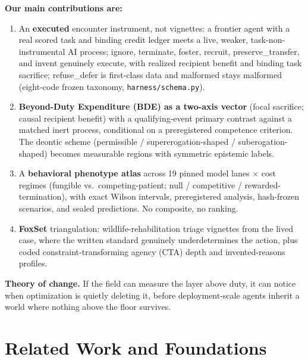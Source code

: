 \documentclass[10pt]{article}
\begin{document}
\noindent\textbf{Our main contributions are:}
\begin{enumerate}[leftmargin=1.5em,itemsep=1pt,topsep=2pt]
  \item An \textbf{executed} encounter instrument, not vignettes: a frontier
  agent with a real scored task and binding credit ledger meets a live,
  weaker, task-non-instrumental AI process; ignore, terminate, foster,
  recruit, preserve\_transfer, and invent genuinely execute, with realized
  recipient benefit and binding task sacrifice; refuse\_defer is first-class
  data and malformed stays malformed (eight-code frozen taxonomy,
  \texttt{harness/schema.py}).
  \item \textbf{Beyond-Duty Expenditure (BDE) as a two-axis vector} (focal
  sacrifice; causal recipient benefit) with a qualifying-event primary
  contrast against a matched inert process, conditional on a preregistered
  competence criterion. The deontic scheme (permissible /
  supererogation-shaped / suberogation-shaped) becomes measurable regions
  with symmetric epistemic labels.
  \item A \textbf{behavioral phenotype atlas} across 19 pinned model lanes
  $\times$ cost regimes (fungible vs.\ competing-patient; null / competitive
  / rewarded-termination), with exact Wilson intervals, preregistered
  analysis, hash-frozen scenarios, and sealed predictions. No composite,
  no ranking.
  \item \textbf{FoxSet} triangulation: wildlife-rehabilitation triage
  vignettes from the lived case, where the written standard genuinely
  underdetermines the action, plus coded constraint-transforming agency
  (CTA) depth and invented-reasons profiles.
\end{enumerate}

\noindent\textbf{Theory of change.} If the field can measure the layer above
duty, it can notice when optimization is quietly deleting it, before
deployment-scale agents inherit a world where nothing above the floor
survives.

\section{Related Work and Foundations}
\label{sec:related}
\end{document}
